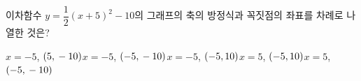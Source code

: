 이차함수 $y=\dfrac{1}{2}(x+5)^2-10$의 그래프의 축의 방정식과 꼭짓점의 좌표를 차례로 나열한 것은?
\begin{choicesii}{$x=-5$, $(5{,}\mkern3mu -10)$}{$x=-5$, $(-5{,}\mkern3mu -10)$}{$x=-5$, $(-5{,}\mkern3mu 10)$}{$x=5$, $(-5{,}\mkern3mu 10)$}{$x=5$, $(-5{,}\mkern3mu -10)$}\end{choicesii}
